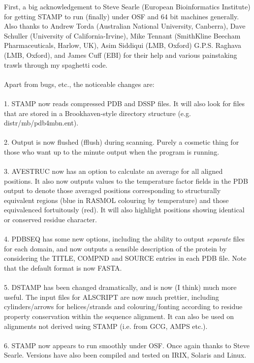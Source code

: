 First, a big acknowledgement to Steve Searle (European Bioinformatics Institute)
for getting STAMP to run (finally) under OSF and 64 bit machines generally.
Also thanks to Andrew Torda 
(Australian National University, Canberra), Dave Schuller (University of California-Irvine),
Mike Tennant (SmithKline Beecham Pharmaceuticals, Harlow, UK),
Asim Siddiqui (LMB, Oxford) G.P.S. Raghava (LMB, Oxford), and James Cuff (EBI)
for their help and various painstaking trawls through my spaghetti code.\\
\\
Apart from bugs, etc., the noticeable changes are:\\
\\
1. STAMP now reads compressed PDB and DSSP files.  It will also look for files that
are stored in a Brookhaven-style directory structure (e.g. distr/mb/pdb4mbn.ent).\\
\\
2. Output is now flushed (fflush) during scanning.  Purely a cosmetic thing for those who
want up to the minute output when the program is running.\\
\\
3. AVESTRUC now has an option to calculate an average for all aligned positions.  It also
now outputs values to the temperature factor fields in the PDB output to denote those
averaged positions corresponding to structurally equivalent regions (blue in RASMOL 
colouring by temperature) and those equivalenced fortuitously (red).  It will also highlight
positions showing identical or conserved residue character.\\
\\
4. PDBSEQ has some new options, including the ability to output {\em separate} files
for each domain, and now outputs a sensible description of the protein by
considering the TITLE, COMPND and SOURCE entries in each PDB file.  Note that the
default format is now FASTA.\\
\\
5. DSTAMP has been changed dramatically, and is now (I think) much more useful.  The
input files for ALSCRIPT are now much prettier, including cylinders/arrows for helices/strands 
and colouring/fonting according to residue property conservation within the sequence alignment.
It can also be used on alignments not derived using STAMP (i.e. from GCG, AMPS etc.).\\
\\
6. STAMP now appears to run smoothly under OSF.  Once again thanks to Steve Searle.  Versions
have also been compiled and tested on IRIX, Solaris and Linux.\\
